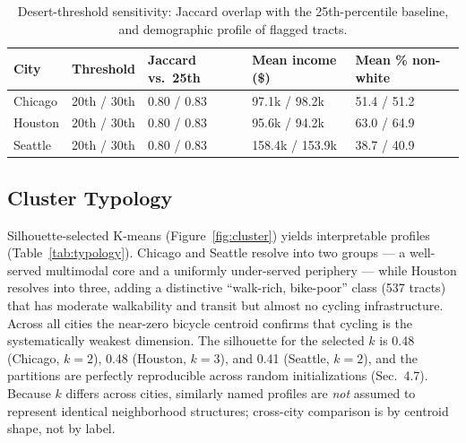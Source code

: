 \documentclass[11pt]{article}
\begin{document}
\begin{table}[htbp]
\centering
\caption{Desert-threshold sensitivity: Jaccard overlap with the 25th-percentile
baseline, and demographic profile of flagged tracts.}
\label{tab:sensitivity}
\small
\begin{tabularx}{\textwidth}{l c Y Y Y}
\toprule
\textbf{City} & \textbf{Threshold} & \textbf{Jaccard vs.\ 25th} & \textbf{Mean income (\$)} & \textbf{Mean \% non-white} \\
\midrule
Chicago & 20th / 30th & 0.80 / 0.83 & 97.1k / 98.2k & 51.4 / 51.2 \\
Houston & 20th / 30th & 0.80 / 0.83 & 95.6k / 94.2k & 63.0 / 64.9 \\
Seattle & 20th / 30th & 0.80 / 0.83 & 158.4k / 153.9k & 38.7 / 40.9 \\
\bottomrule
\end{tabularx}
\end{table}

\subsection{Cluster Typology}
Silhouette-selected K-means (Figure~\ref{fig:cluster}) yields interpretable
profiles (Table~\ref{tab:typology}). Chicago and Seattle resolve into two groups
--- a well-served multimodal core and a uniformly under-served periphery ---
while Houston resolves into three, adding a distinctive ``walk-rich, bike-poor''
class (537 tracts) that has moderate walkability and transit but almost no
cycling infrastructure. Across all cities the near-zero bicycle centroid confirms
that cycling is the systematically weakest dimension. The silhouette for the
selected $k$ is 0.48 (Chicago, $k{=}2$), 0.48 (Houston, $k{=}3$), and 0.41
(Seattle, $k{=}2$), and the partitions are perfectly reproducible across random
initializations (Sec.~4.7). Because $k$ differs across cities, similarly named
profiles are \emph{not} assumed to represent identical neighborhood structures;
cross-city comparison is by centroid shape, not by label.
\end{document}
